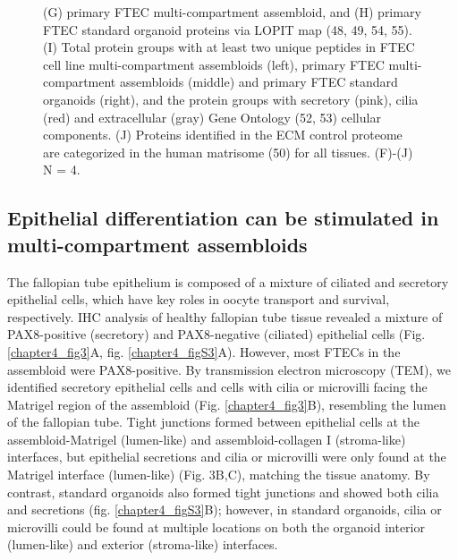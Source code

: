 \begin{refsection}
    \begin{figure}[h!]
        \ContinuedFloat
        \captionsetup{font=small}
        \caption[]{ (G) primary FTEC multi-compartment assembloid, and (H) primary FTEC standard organoid proteins via LOPIT map (48, 49, 54, 55). (I) Total protein groups with at least two unique peptides in FTEC cell line multi-compartment assembloids (left), primary FTEC multi-compartment assembloids (middle) and primary FTEC standard organoids (right), and the protein groups with secretory (pink), cilia (red) and extracellular (gray) Gene Ontology (52, 53) cellular components. (J) Proteins identified in the ECM control proteome are categorized in the human matrisome (50) for all tissues. (F)-(J) N = 4.}
    \end{figure}
    
    \subsection{Epithelial differentiation can be stimulated in multi-compartment assembloids}
    The fallopian tube epithelium is composed of a mixture of ciliated and secretory epithelial cells, which have key roles in oocyte transport and survival, respectively\cite{yuan2021a,suarez2021a,wanggren2008a}. IHC analysis of healthy fallopian tube tissue revealed a mixture of PAX8-positive (secretory) and PAX8-negative (ciliated)\cite{kessler2015a,perets2013a,chaves-moreira2022a,karst2011a,karst2012a} epithelial cells (Fig. \ref{chapter4_fig3}A, fig. \ref{chapter4_figS3}A). However, most FTECs in the assembloid were PAX8-positive. By transmission electron microscopy (TEM), we identified secretory epithelial cells and cells with cilia or microvilli facing the Matrigel region of the assembloid (Fig. \ref{chapter4_fig3}B), resembling the lumen of the fallopian tube\cite{kessler2015a}. Tight junctions formed between epithelial cells at the assembloid-Matrigel (lumen-like) and assembloid-collagen I (stroma-like) interfaces, but epithelial secretions and cilia or microvilli were only found at the Matrigel interface (lumen-like) (Fig. 3B,C), matching the tissue anatomy. By contrast, standard organoids also formed tight junctions and showed both cilia and secretions (fig. \ref{chapter4_figS3}B); however, in standard organoids, cilia or microvilli could be found at multiple locations on both the organoid interior (lumen-like) and exterior (stroma-like) interfaces. 

\end{refsection}
